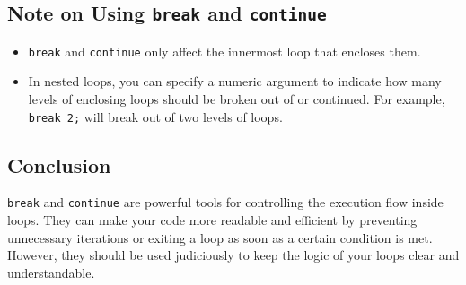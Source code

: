 \documentclass[11pt]{article}
\begin{document}
\subsection{Note on Using \texttt{break} and \texttt{continue}}
\label{sec:orgd002053}
\begin{itemize}
\item \texttt{break} and \texttt{continue} only affect the innermost loop that encloses
them.
\item In nested loops, you can specify a numeric argument to indicate how
many levels of enclosing loops should be broken out of or continued.
For example, \texttt{break 2;} will break out of two levels of loops.
\end{itemize}

\subsection{Conclusion}
\label{sec:orgbae73b6}
\texttt{break} and \texttt{continue} are powerful tools for controlling the execution
flow inside loops. They can make your code more readable and efficient
by preventing unnecessary iterations or exiting a loop as soon as a
certain condition is met. However, they should be used judiciously to
keep the logic of your loops clear and understandable.
\end{document}
